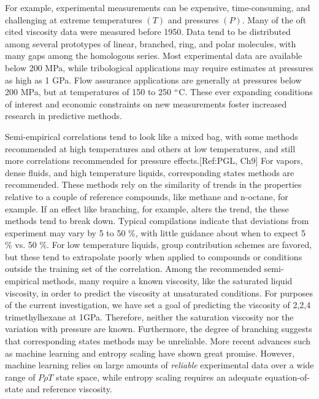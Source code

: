 \documentclass[preprint,review,12pt]{elsarticle}
\begin{document}
	For example, experimental measurements can be expensive, time-consuming, and challenging at extreme temperatures $(T)$ and pressures $(P)$. Many of the oft cited viscosity data were measured before 1950. Data tend to be distributed among several prototypes of linear, branched, ring, and polar molecules, with many gaps among the homologous series. Most experimental data are available below 200 MPa, while tribological applications may require estimates at pressures as high as 1 GPa.  Flow assurance applications are generally at pressures below 200 MPa, but at temperatures of  150 to 250 $^{\rm o}$C. These ever expanding conditions of interest and economic constraints on new measurements foster increased research in predictive methods.
	
	Semi-empirical correlations tend to look like a mixed bag, with some methods recommended at high temperatures and others at low temperatures, and still more correlations recommended for pressure effects.[Ref:PGL, Ch9] For vapors, dense fluids, and high temperature liquids, corresponding states methods are recommended. These methods rely on the similarity of trends in the properties relative to a couple of reference compounds, like methane and n-octane, for example. If an effect like branching, for example, alters the trend, the these methods tend to break down.  Typical compilations indicate that deviations from experiment may vary by 5 to 50 \%, with little guidance about when to expect 5 \% vs. 50 \%. For low temperature liquids, group contribution schemes are favored, but these tend to extrapolate poorly when applied to compounds or conditions outside the training set of the correlation. Among the recommended semi-empirical methods, many require a known viscosity, like the saturated liquid viscosity, in order to predict the viscosity at unsaturated conditions. For purposes of the current investigation, we have set a goal of predicting the viscosity of 2,2,4 trimethylhexane at 1GPa. Therefore, neither the saturation viscosity nor the variation with pressure are known. Furthermore, the degree of branching suggests that corresponding states methods may be unreliable. More recent advances such as machine learning and entropy scaling have shown great promise. However, machine learning relies on large amounts of \textit{reliable} experimental data over a wide range of $P \rho T$ state space, while entropy scaling requires an adequate equation-of-state and reference viscosity.
	
	
\end{document}
